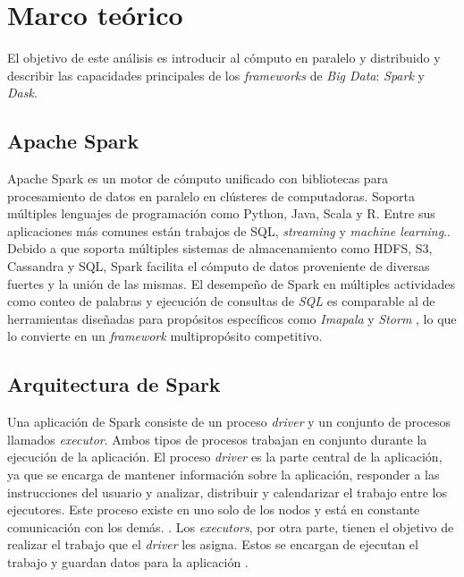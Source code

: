 \chapter{Marco teórico}

\noindent El objetivo de este análisis es introducir al cómputo en paralelo y distribuido y describir las capacidades principales de los \textit{frameworks}  de \textit{Big Data}: \textit{Spark} y \textit{Dask}.

\newpage


\section{Apache Spark}

Apache Spark es un motor de cómputo unificado con bibliotecas para procesamiento de datos en paralelo en clústeres de computadoras. Soporta múltiples lenguajes de programación como Python, Java, Scala y R. Entre sus aplicaciones más comunes están trabajos de SQL, \textit{streaming} y \textit{machine learning}.\cite{sparkguide}. Debido a que soporta múltiples sistemas de almacenamiento como HDFS, S3, Cassandra y SQL, Spark facilita el cómputo de datos proveniente de diversas fuertes y la unión de las mismas. El desempeño de Spark en múltiples actividades como conteo de palabras y ejecución de consultas de \textit{SQL} es comparable al de herramientas diseñadas para propósitos específicos como \textit{Imapala} y \textit{Storm} \cite{sparkberkeley}, lo que lo convierte en un \textit{framework} multipropósito competitivo.

\section{Arquitectura de Spark}

Una aplicación de Spark consiste de un proceso \textit{driver} y un conjunto de procesos llamados \textit{executor}. Ambos tipos de procesos trabajan en conjunto durante la ejecución de la aplicación. El proceso \textit{driver} es la parte central de la aplicación, ya que se encarga de mantener información sobre la aplicación, responder a las instrucciones del usuario y analizar, distribuir y calendarizar el trabajo entre los ejecutores. Este proceso existe en uno solo de los nodos y está en constante comunicación con los demás. \cite{sparkguide}. Los \textit{executors}, por otra parte, tienen el objetivo de realizar el trabajo que el \textit{driver} les asigna. Estos se encargan de ejecutan el trabajo y guardan datos para la aplicación \cite{sparkclusteroverview}.

